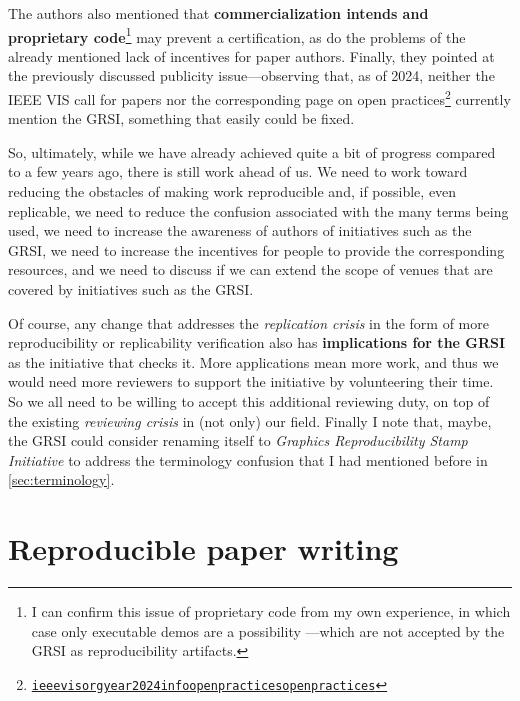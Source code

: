 \documentclass[conference]{vgtc}                     %
\begin{document}
The authors also mentioned that \textbf{commercialization intends and proprietary code}\footnote{I can confirm this issue of proprietary code from my own experience, in which case only executable demos are a possibility \cite{Isenberg:2022:PEP}---which are not accepted by the GRSI as reproducibility artifacts.} may prevent a certification, as do the problems of the already mentioned lack of incentives for paper authors. Finally, they pointed at the previously discussed publicity issue---observing that, as of 2024, neither the IEEE VIS call for papers nor the corresponding page on open practices\footnote{\href{https://ieeevis.org/year/2024/info/open-practices/open-practices}{\texttt{ieeevisorg\discretionary{/}{}{/}year\discretionary{/}{}{/}2024\discretionary{/}{}{/}info\discretionary{/}{}{/}open\discretionary{}{-}{-}practices\discretionary{/}{}{/}open\discretionary{}{-}{-}practices}}} currently mention the GRSI, something that easily could be fixed.

So, ultimately, while we have already achieved quite a bit of progress compared to a few years ago, there is still work ahead of us. We need to work toward reducing the obstacles of making work reproducible and, if possible, even replicable, we need to reduce the confusion associated with the many terms being used, we need to increase the awareness of authors of initiatives such as the GRSI, we need to increase the incentives for people to provide the corresponding resources, and we need to discuss if we can extend the scope of venues that are covered by initiatives such as the GRSI.

Of course, any change that addresses the \emph{replication crisis} in the form of more reproducibility or replicability verification also has \textbf{implications for the GRSI} as the initiative that checks it. More applications mean more work, and thus we would need more reviewers to support the initiative by volunteering their time. So we all need to be willing to accept this additional reviewing duty, on top of the existing \emph{reviewing crisis} in (not only) our field. Finally I note that, maybe, the GRSI could consider renaming itself to \emph{Graphics Reproducibility Stamp Initiative} to address the terminology confusion that I had mentioned before in \autoref{sec:terminology}. 

\section{Reproducible paper writing}
\label{sec:analysis-reproducibility}
\end{document}
